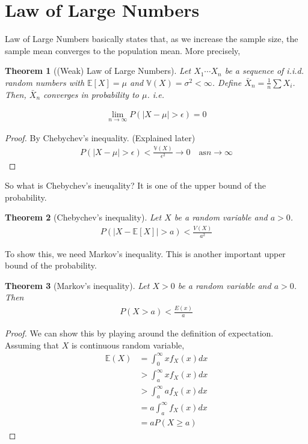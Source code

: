 \documentclass[11pt]{article}
\newtheorem{theorem}{Theorem}[section]
\newcommand{\E}{\mathbb{E}}
\newcommand{\V}{\mathbb{V}}
\begin{document}
\section{Law of Large Numbers}

Law of Large Numbers basically states that, as we increase the sample size, the sample mean converges to the 
population mean. More precisely,
 
\begin{theorem}[(Weak) Law of Large Numbers]
Let $X_1 \cdots X_n$ be a sequence of i.i.d. random numbers with $\E[X] = \mu$ and $\V(X) = \sigma^2 < \infty$. 
Define $\bar{X}_n = \frac{1}{n}\sum X_i$. Then, $\bar{X}_n$ converges in probability to $\mu$. i.e. 

\begin{align}
  \lim_{n \to \infty} P(\vert X - \mu \vert > \epsilon) = 0
\end{align}
\end{theorem}

\begin{proof}
By Chebychev's inequality. (Explained later)
\begin{align}
  P(\vert X - \mu \vert > \epsilon) < \frac{\V(X)}{\epsilon^2} \to 0\quad \text{as} n \to \infty
\end{align}
\end{proof}

So what is Chebychev's ineuqality? It is one of the upper bound of the probability. 

\begin{theorem}[Chebychev's inequality]
Let $X$ be a random variable and $a > 0$. 
\begin{align}
  P(\vert X - \E[X] \vert  > a) < \frac{V(X)}{a^2}
\end{align}
\end{theorem}

To show this, we need Markov's inequality. This is another important upper bound of the probability. 
\begin{theorem}[Markov's inequality]
Let $X > 0$ be a random variable and $a > 0$. Then
\begin{align}
  P(X > a) < \frac{E(x)}{a}
\end{align}
\end{theorem}

\begin{proof}
We can show this by playing around the definition of expectation. Assuming that $X$ is continuous random variable, 
\begin{align}
  \E(X) &= \int_0^\infty x f_X(x) dx \\
        &> \int_a^\infty x f_X(x) dx \\
        &> \int_a^\infty a f_X(x) dx \\
        &= a \int_a^\infty f_X(x) dx \\
        &= a P(X \geq a)
\end{align}
\end{proof}



\nocite{*}

\end{document}
